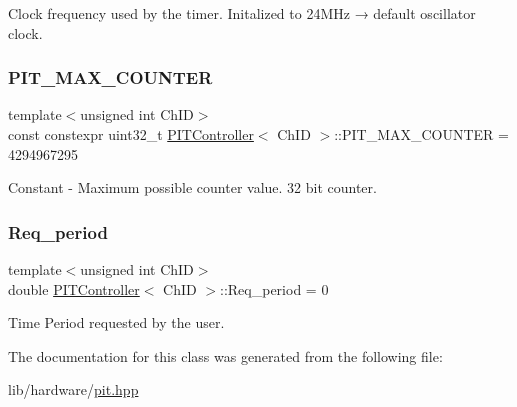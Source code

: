 Clock frequency used by the timer. Initalized to 24\+M\+Hz → default oscillator clock. 

\mbox{\label{classPITController_a53778fe7e47ac9741bef0bc190e0646a}} 
\subsubsection{\texorpdfstring{P\+I\+T\+\_\+\+M\+A\+X\+\_\+\+C\+O\+U\+N\+T\+ER}{PIT\_MAX\_COUNTER}}
{\footnotesize\ttfamily template$<$unsigned int Ch\+ID$>$ \\
const constexpr uint32\+\_\+t \hyperlink{classPITController}{P\+I\+T\+Controller}$<$ Ch\+ID $>$\+::P\+I\+T\+\_\+\+M\+A\+X\+\_\+\+C\+O\+U\+N\+T\+ER = 4294967295\hspace{0.3cm}{\ttfamily [static]}}



Constant -\/ Maximum possible counter value. 32 bit counter. 

\mbox{\label{classPITController_a9de0af49a52145c8d2a8f4e90a519b60}} 
\subsubsection{\texorpdfstring{Req\+\_\+period}{Req\_period}}
{\footnotesize\ttfamily template$<$unsigned int Ch\+ID$>$ \\
double \hyperlink{classPITController}{P\+I\+T\+Controller}$<$ Ch\+ID $>$\+::Req\+\_\+period = 0}



Time Period requested by the user. 



The documentation for this class was generated from the following file\+:\begin{DoxyCompactItemize}
\item 
lib/hardware/\hyperlink{pit_8hpp}{pit.\+hpp}\end{DoxyCompactItemize}
